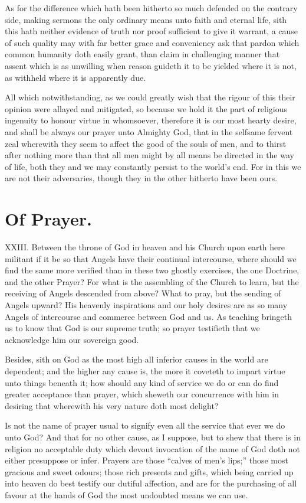 As for the difference which hath been hitherto so much defended on the contrary side,
 making sermons the only ordinary means unto faith and eternal life, sith this hath neither evidence of truth nor proof sufficient to give it warrant, a cause of such quality may with far better grace and conveniency ask that pardon which common humanity doth easily grant, than claim in challenging manner that assent which is as unwilling when reason guideth it to be yielded where it is not, as withheld where it is apparently due.

All which notwithstanding, as we could greatly wish that the rigour of this their opinion were allayed and mitigated, so because we hold it the part of religious ingenuity to honour virtue in whomsoever, therefore it is our most hearty desire, and shall be always our prayer unto Almighty God, that in the selfsame fervent zeal wherewith they seem to affect the good of the souls of men, and to thirst after nothing more than that all men might by all means be directed in the way of life, both they and we may constantly persist to the world’s end. For in this we are not their adversaries, though they in the other hitherto have been ours.


\section*{Of Prayer.}
XXIII. Between the throne of God in heaven and his Church upon earth here militant if it be so that Angels have their continual intercourse, where should we find the same more verified than in these two ghostly exercises, the one Doctrine, and the other Prayer? For what is the assembling of the Church to learn, but the receiving of Angels descended from above? What to pray, but the sending of Angels upward? His heavenly inspirations and our holy desires are as so many Angels of intercourse and commerce between God and us. As teaching bringeth us to know that God is our supreme truth; so prayer testifieth that we acknowledge him our sovereign good.

Besides, sith on God as the most high all inferior causes in the world are dependent; and the higher any cause is, the more it coveteth to impart virtue unto things beneath it; how should any kind of service we do or can do find greater acceptance than prayer, which sheweth our concurrence with him in desiring that wherewith his very nature doth most delight?

Is not the name of prayer usual to signify even all the service that ever we do unto God? And that for no other cause,  as I suppose, but to shew that there is in religion no acceptable duty which devout invocation of the name of God doth not either presuppose or infer.
 Prayers are those “calves of men’s lips;” those most gracious and sweet odours; those rich presents and gifts, which being carried up into heaven do best testify our dutiful affection, and are for the purchasing of all favour at the hands of God the most undoubted means we can use.

